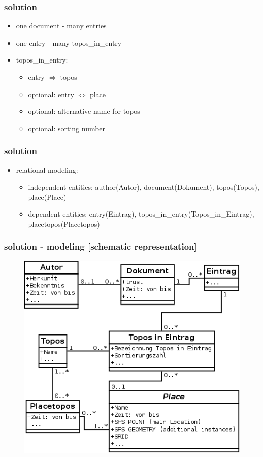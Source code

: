 \documentclass{beamer}
\begin{document}
	\begin{frame}
			\frametitle{solution}
			\begin{itemize}
				\item one document - many entries
				\item one entry - many topos\_in\_entry
				\item topos\_in\_entry: 
				\begin{itemize}
					\item entry $\Leftrightarrow$ topos 
					\item optional: entry $\Leftrightarrow$ place 
					\item optional: alternative name for topos
					\item optional: sorting number
				\end{itemize}			 
			\end{itemize} 		
	\end{frame}

	\begin{frame}
			\frametitle{solution}
			\begin{itemize}
  					\item relational modeling:
					\begin{itemize}
						\item independent entities: author(Autor), document(Dokument), topos(Topos), place(Place)
						\item dependent entities: entry(Eintrag), topos\_in\_entry(Topos\_in\_Eintrag), placetopos(Placetopos)
					\end{itemize}
				\end{itemize} 
	\end{frame}
	
	\begin{frame}
			\frametitle{solution - modeling [schematic representation]} 
				\begin{figure}
					\includegraphics[scale=0.3]{detail_2.png} 
				\end{figure}			
	\end{frame}
\end{document}
